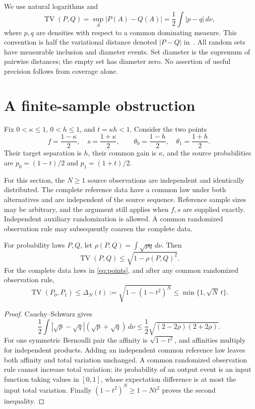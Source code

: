 \documentclass[11pt,a4paper]{article}
\newcommand{\TV}{\operatorname{TV}}
\begin{document}
We use natural logarithms and
\[
 \TV(P,Q)=\sup_A|P(A)-Q(A)|=\frac12\int|p-q|\,d\nu,
\]
where $p,q$ are densities with respect to a common dominating measure. This convention is half the variational distance denoted $|P-Q|$ in~\cite[Section II-B]{sason}. All random sets have measurable inclusion and diameter events. Set diameter is the supremum of pairwise distances; the empty set has diameter zero. No assertion of useful precision follows from coverage alone.

\section{A finite-sample obstruction}

Fix $0<\kappa\le1$, $0<h\le1$, and $t=\kappa h<1$. Consider the two points
\begin{equation}
 f=\frac{1-\kappa}{2},\quad s=\frac{1+\kappa}{2},\qquad
 \theta_0=\frac{1-h}{2},\quad \theta_1=\frac{1+h}{2}.
 \label{eq:points}
\end{equation}
Their target separation is $h$, their common gain is $\kappa$, and the source probabilities are $p_0=(1-t)/2$ and $p_1=(1+t)/2$.

For this section, the $N\ge1$ source observations are independent and identically distributed. The complete reference data have a common law under both alternatives and are independent of the source sequence. Reference sample sizes may be arbitrary, and the argument still applies when $f,s$ are supplied exactly. Independent auxiliary randomization is allowed. A common randomized observation rule may subsequently coarsen the complete data.

\begin{lemma}
For probability laws $P,Q$, let $\rho(P,Q)=\int\sqrt{pq}\,d\nu$. Then
\[
 \TV(P,Q)\le\sqrt{1-\rho(P,Q)^2}.
\]
For the complete data laws in \eqref{eq:points}, and after any common randomized observation rule,
\begin{equation}
 \TV(P_0,P_1)\le\Delta_N(t):=\sqrt{1-(1-t^2)^N}
 \le\min\{1,\sqrt N\,t\}.
 \label{eq:affinity}
\end{equation}
\end{lemma}
\begin{proof}
Cauchy--Schwarz gives
\[
 \frac12\int|\sqrt p-\sqrt q|(\sqrt p+\sqrt q)\,d\nu
 \le\frac12\sqrt{(2-2\rho)(2+2\rho)}.
\]
For one symmetric Bernoulli pair the affinity is $\sqrt{1-t^2}$, and affinities multiply for independent products. Adding an independent common reference law leaves both affinity and total variation unchanged. A common randomized observation rule cannot increase total variation: its probability of an output event is an input function taking values in $[0,1]$, whose expectation difference is at most the input total variation. Finally $(1-t^2)^N\ge1-Nt^2$ proves the second inequality.
\end{proof}
\end{document}
